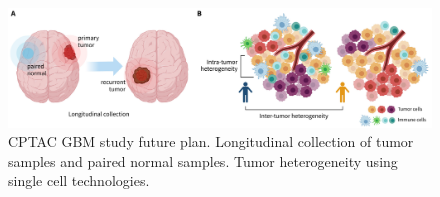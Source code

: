 \begin{figure}[tb]
    \centering
    \includegraphics[width=1\linewidth]{figures/chap05_conclusion/gbm_future_plan.pdf}
    \caption[CPTAC GBM study future plan.]{%
        CPTAC GBM study future plan.
         Longitudinal collection of tumor samples and paired normal samples.
         Tumor heterogeneity using single cell technologies.
    }
    \label{fig:cptac-gbm-future-plan}
\end{figure}
